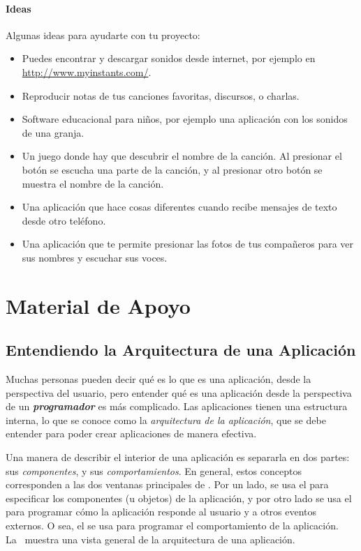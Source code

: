 \paragraph{Ideas} Algunas ideas para ayudarte con tu proyecto:

\begin{itemize}

\item Puedes encontrar y descargar sonidos desde internet, por ejemplo
  en \url{http://www.myinstants.com/}.

\item Reproducir notas de tus canciones favoritas, discursos, o charlas.

\item Software educacional para niños, por ejemplo una aplicación con
  los sonidos de una granja.

\item Un juego donde hay que descubrir el nombre de la canción. Al
  presionar el botón se escucha una parte de la canción, y al
  presionar otro botón se muestra el nombre de la canción.

\item Una aplicación que hace cosas diferentes cuando recibe mensajes
  de texto desde otro teléfono.

\item Una aplicación que te permite presionar las fotos de tus
  compañeros para ver sus nombres y escuchar sus voces.

\end{itemize}

\section{Material de Apoyo}
\label{sec:material-de-apoyo}

\subsection*{Entendiendo la Arquitectura de una Aplicación}

Muchas personas pueden decir qué es lo que es una aplicación, desde la
perspectiva del usuario, pero entender qué es una aplicación desde la
perspectiva de un \textit{\textbf{programador}} es más complicado. Las
aplicaciones tienen una estructura interna, lo que se conoce como la
\emph{arquitectura de la aplicación}, que se debe entender para poder
crear aplicaciones de manera efectiva.

Una manera de describir el interior de una aplicación es separarla en
dos partes: sus \emph{componentes}, y sus \emph{comportamientos}. En
general, estos conceptos corresponden a las dos ventanas principales
de \AppInventor. Por un lado, se usa el \componentDesigner para
especificar los componentes (u objetos) de la aplicación, y por otro
lado se usa el \blockEditor para programar cómo la aplicación responde
al usuario y a otros eventos externos. O sea, el \blockEditor se usa
para programar el comportamiento de la aplicación. La~
muestra una vista general de la arquitectura de una aplicación.

